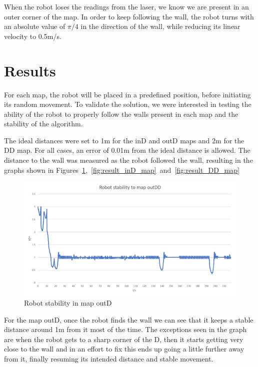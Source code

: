\documentclass[10pt,journal,compsoc]{IEEEtran}
\begin{document}
When the robot loses the readings from the laser, we know we are present in an outer corner of the map. In order to keep following the wall, the robot turns with an absolute value of $\pi/4$ in the direction of the wall, while reducing its linear velocity to 0.5m/s.

\section{Results}
For each map, the robot will be placed in a predefined position, before initiating its random movement. To validate the solution, we were interested in testing the ability of the robot to properly follow the walls present in each map and the stability of the algorithm.

The ideal distances were set to 1m for the inD and outD maps and 2m for the DD map. For all cases, an error of 0.01m from the ideal distance is allowed. The distance to the wall was measured as the robot followed the wall, resulting in the graphs shown in Figures~\ref{fig:result_outD_map},~\ref{fig:result_inD_map}~and~\ref{fig:result_DD_map}

\begin{figure}[thpb]
\centering
\includegraphics[scale=0.2]{img/map_outD.jpg}
\caption{Robot stability in map outD}
\label{fig:result_outD_map}
\end{figure}

For the map outD, once the robot finds the wall we can see that it keeps a stable distance around 1m from it most of the time. The exceptions seen in the graph are when the robot gets to a sharp corner of the D, then it starts getting very close to the wall and in an effort to fix this ends up going a little further away from it, finally resuming its intended distance and stable movement.
\end{document}
